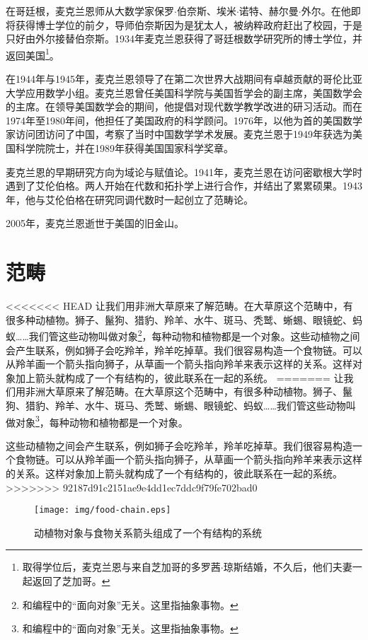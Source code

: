 \documentclass{article}
\begin{document}
在哥廷根，麦克兰恩师从大数学家保罗$\cdot$伯奈斯、埃米$\cdot$诺特、赫尔曼$\cdot$外尔。在他即将获得博士学位的前夕，导师伯奈斯因为是犹太人，被纳粹政府赶出了校园，于是只好由外尔接替伯奈斯。1934年麦克兰恩获得了哥廷根数学研究所的博士学位，并返回美国\footnote{取得学位后，麦克兰恩与来自芝加哥的多罗茜$\cdot$琼斯结婚，不久后，他们夫妻一起返回了芝加哥。}。

在1944年与1945年，麦克兰恩领导了在第二次世界大战期间有卓越贡献的哥伦比亚大学应用数学小组。麦克兰恩曾任美国科学院与美国哲学会的副主席，美国数学会的主席。在领导美国数学会的期间，他提倡对现代数学教学改进的研习活动。而在1974年至1980年间，他担任了美国政府的科学顾问。1976年，以他为首的美国数学家访问团访问了中国，考察了当时中国数学学术发展。麦克兰恩于1949年获选为美国科学院院士，并在1989年获得美国国家科学奖章。

麦克兰恩的早期研究方向为域论与赋值论。1941年，麦克兰恩在访问密歇根大学时遇到了艾伦伯格。两人开始在代数和拓扑学上进行合作，并结出了累累硕果。1943年，他与艾伦伯格在研究同调代数时一起创立了范畴论。

2005年，麦克兰恩逝世于美国的旧金山。

\section{范畴}

<<<<<<< HEAD
让我们用非洲大草原来了解范畴。在大草原这个范畴中，有很多种动植物。狮子、鬣狗、猎豹、羚羊、水牛、斑马、秃鹫、蜥蜴、眼镜蛇、蚂蚁……我们管这些动物叫做对象\footnote{和编程中的“面向对象”无关。这里指抽象事物。}，每种动物和植物都是一个对象。这些动植物之间会产生联系，例如狮子会吃羚羊，羚羊吃掉草。我们很容易构造一个食物链。可以从羚羊画一个箭头指向狮子，从草画一个箭头指向羚羊来表示这样的关系。这样对象加上箭头就构成了一个有结构的，彼此联系在一起的系统。
=======
让我们用非洲大草原来了解范畴。在大草原这个范畴中，有很多种动植物。狮子、鬣狗、猎豹、羚羊、水牛、斑马、秃鹫、蜥蜴、眼镜蛇、蚂蚁……我们管这些动物叫做对象\footnote{和编程中的“面向对象”无关。这里指抽象事物。}，每种动物和植物都是一个对象。

这些动植物之间会产生联系，例如狮子会吃羚羊，羚羊吃掉草。我们很容易构造一个食物链。可以从羚羊画一个箭头指向狮子，从草画一个箭头指向羚羊来表示这样的关系。这样对象加上箭头就构成了一个有结构的，彼此联系在一起的系统。
>>>>>>> 92187d91c2151ae9e4dd1ec7ddc9f79fe702bad0

\begin{figure}[htbp]
 \centering
 \texttt{[image: img/food-chain.eps]}
 \caption{动植物对象与食物关系箭头组成了一个有结构的系统}
 \label{fig:powerset}
\end{figure}
\end{document}
